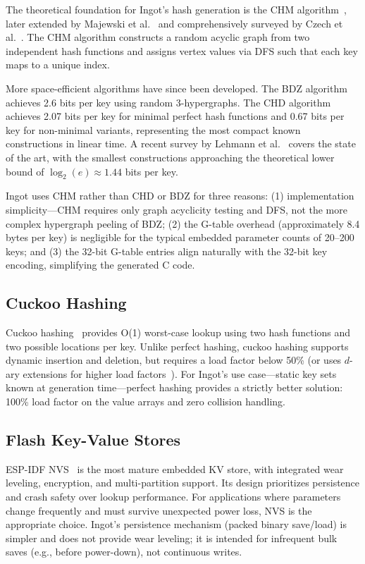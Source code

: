 \documentclass[10pt,twocolumn,letterpaper]{article}
\begin{document}
The theoretical foundation for Ingot's hash generation is the CHM
algorithm~\cite{chm-1992}, later extended by Majewski et
al.~\cite{chm-family-1996} and comprehensively surveyed by Czech et
al.~\cite{chm-survey-1997}.  The CHM algorithm constructs a random
acyclic graph from two independent hash functions and assigns vertex
values via DFS such that each key maps to a unique index.

More space-efficient algorithms have since been developed.  The
BDZ algorithm~\cite{bdz} achieves 2.6 bits per key using random
3-hypergraphs.  The CHD algorithm~\cite{chd} achieves 2.07 bits per
key for minimal perfect hash functions and 0.67 bits per key for
non-minimal variants, representing the most compact known
constructions in linear time.  A recent survey by Lehmann et
al.~\cite{mph-survey-2025} covers the state of the art, with the
smallest constructions approaching the theoretical lower bound of
$\log_2(e) \approx 1.44$ bits per key.

Ingot uses CHM rather than CHD or BDZ for three reasons: (1)
implementation simplicity---CHM requires only graph acyclicity
testing and DFS, not the more complex hypergraph peeling of BDZ;
(2) the G-table overhead (approximately 8.4 bytes per key) is
negligible for the typical embedded parameter counts of 20--200 keys;
and (3) the 32-bit G-table entries align naturally with the 32-bit
key encoding, simplifying the generated C code.

\subsection{Cuckoo Hashing}

Cuckoo hashing~\cite{cuckoo-hashing} provides O(1) worst-case lookup
using two hash functions and two possible locations per key.  Unlike
perfect hashing, cuckoo hashing supports dynamic insertion and
deletion, but requires a load factor below 50\% (or uses $d$-ary
extensions for higher load factors~\cite{cuckoo-dary}).  For
Ingot's use case---static key sets known at generation time---perfect
hashing provides a strictly better solution: 100\% load factor on the
value arrays and zero collision handling.

\subsection{Flash Key-Value Stores}

ESP-IDF NVS~\cite{esp-nvs} is the most mature embedded KV store,
with integrated wear leveling, encryption, and multi-partition
support.  Its design prioritizes persistence and crash safety over
lookup performance.  For applications where parameters change
frequently and must survive unexpected power loss, NVS is the
appropriate choice.  Ingot's persistence mechanism (packed binary
save/load) is simpler and does not provide wear leveling; it is
intended for infrequent bulk saves (e.g., before power-down), not
continuous writes.
\end{document}

